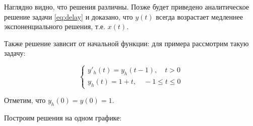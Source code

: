 Наглядно видно, что решения различны. Позже будет приведено аналитическое решение задачи \ref{eq:delay} и доказано, что $y(t)$ всегда возрастает медленнее экспоненциального решения, т.е. $x(t)$.

Также решение зависит от начальной функции: для примера рассмотрим такую задачу:

\begin{equation}\label{eq:no-delay-history}
\left\{
\begin{aligned}
y'_h(t) = y_h(t-1), \quad t>0\\
y_h(t) = 1+t, \quad -1 \leq t \leq 0
\end{aligned}
\right.
\end{equation}

Отметим, что $y_h(0) = y(0) = 1$.

Построим решения на одном графике: